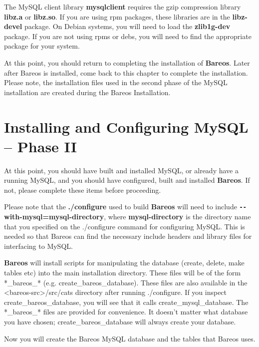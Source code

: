 The MySQL client library {\bf mysqlclient} requires the gzip compression
library {\bf libz.a} or {\bf libz.so}. If you are using rpm packages, these
libraries are in the {\bf libz-devel} package. On Debian systems, you will
need to load the {\bf zlib1g-dev} package. If you are not using rpms or debs,
you will need to find the appropriate package for your system.

At this point, you should return to completing the installation of {\bf
Bareos}. Later after Bareos is installed, come back to this chapter to
complete the installation. Please note, the installation files used in the
second phase of the MySQL installation are created during the Bareos
Installation.

\label{mysql_phase2}
\section{Installing and Configuring MySQL -- Phase II}

At this point, you should have built and installed MySQL, or already have a
running MySQL, and you should have configured, built and installed {\bf
Bareos}. If not, please complete these items before proceeding.

Please note that the {\bf ./configure} used to build {\bf Bareos} will need to
include {\bf \verb:--:with-mysql=mysql-directory}, where {\bf mysql-directory} is the
directory name that you specified on the ./configure command for configuring
MySQL. This is needed so that Bareos can find the necessary include headers
and library files for interfacing to MySQL.

{\bf Bareos} will install scripts for manipulating the database (create,
delete, make tables etc) into the main installation directory. These files
will be of the form *\_bareos\_* (e.g. create\_bareos\_database). These files
are also available in the {\textless}bareos-src{\textgreater}/src/cats directory after
running ./configure. If you inspect create\_bareos\_database, you will see
that it calls create\_mysql\_database. The *\_bareos\_* files are provided for
convenience. It doesn't matter what database you have chosen;
create\_bareos\_database will always create your database.

Now you will create the Bareos MySQL database and the tables that Bareos uses.


